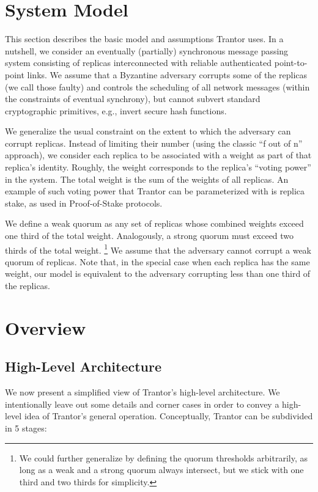 \documentclass{article}
\begin{document}
\section{System Model}
\label{sec:system-model}

This section describes the basic model and assumptions Trantor uses.
In a nutshell, we consider an eventually (partially) synchronous message passing system
consisting of replicas interconnected with reliable authenticated point-to-point links.
We assume that a Byzantine adversary corrupts some of the replicas (we call those faulty)
and controls the scheduling of all network messages (within the constraints of eventual synchrony),
but cannot subvert standard cryptographic primitives, e.g., invert secure hash functions.

We generalize the usual constraint on the extent to which the adversary can corrupt replicas.
Instead of limiting their number (using the classic “f out of n” approach),
we consider each replica to be associated with a weight as part of that replica’s identity.
Roughly, the weight corresponds to the replica’s “voting power” in the system.
The total weight is the sum of the weights of all replicas.
An example of such voting power that Trantor can be parameterized with is replica stake,
as used in Proof-of-Stake protocols. 

We define a weak quorum as any set of replicas whose combined weights exceed one third of the total weight.
Analogously, a strong quorum must exceed two thirds of the total weight.%
\footnote{We could further generalize by defining the quorum thresholds arbitrarily,
as long as a weak and a strong quorum always intersect, but we stick with one third and two thirds for simplicity.}
We assume that the adversary cannot corrupt a weak quorum of replicas.
Note that, in the special case when each replica has the same weight,
our model is equivalent to the adversary corrupting less than one third of the replicas.

\section{Overview}
\label{sec:overview}

\subsection{High-Level Architecture}

We now present a simplified view of Trantor’s high-level architecture.
We intentionally leave out some details and corner cases in order to convey a high-level idea of Trantor’s general operation.
Conceptually, Trantor can be subdivided in 5 stages:
\end{document}
